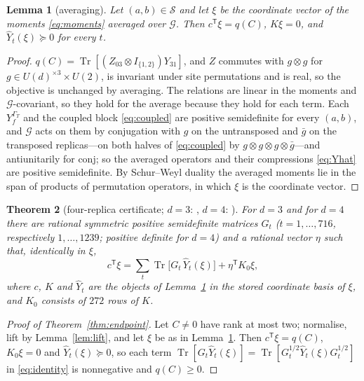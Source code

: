 \documentclass[aps,pra,twocolumn,superscriptaddress,nofootinbib,longbibliography]{revtex4-2}
\DeclareMathOperator{\Tr}{Tr}
\newcommand{\T}{\mathsf T}
\newcommand{\Yh}{\widehat Y}
\theoremstyle{plain}
\newtheorem{theorem}{Theorem}[section]
\newtheorem{lemma}[theorem]{Lemma}
\theoremstyle{definition}
\theoremstyle{remark}
\begin{document}
\begin{lemma}[averaging]\label{lem:averaging}
Let $(a,b)\in\mathcal S$ and let $\xi$ be the coordinate vector of the moments \eqref{eq:moments} averaged over $\mathcal G$. Then $c^{\T}\xi=q(C)$, $K\xi=0$, and $\Yh_t(\xi)\succeq0$ for every $t$.
\end{lemma}
\begin{proof}
$q(C)=\Tr[(Z_{03}\otimes I_{\{1,2\}})Y_{31}]$, and $Z$ commutes with $g\otimes g$ for $g\in U(d)^{\times3}\times U(2)$, is invariant under site permutations and is real, so the objective is unchanged by averaging. The relations are linear in the moments and $\mathcal G$\nobreakdash-covariant, so they hold for the average because they hold for each term. Each $Y_f^{\Gamma_T}$ and the coupled block \eqref{eq:coupled} are positive semidefinite for every $(a,b)$, and $\mathcal G$ acts on them by conjugation with $g$ on the untransposed and $\bar g$ on the transposed replicas---on both halves of \eqref{eq:coupled} by $g\otimes g\otimes g\otimes\bar g$---and antiunitarily for conj; so the averaged operators and their compressions \eqref{eq:Yhat} are positive semidefinite. By Schur--Weyl duality the averaged moments lie in the span of products of permutation operators, in which $\xi$ is the coordinate vector.
\end{proof}

\begin{theorem}[four-replica certificate; $d=3$: \cite{Zenodo}, $d=4$: \cite{Liu}]\label{thm:cert}
For $d=3$ and for $d=4$ there are rational symmetric positive semidefinite matrices $G_t$ ($t=1,\dots,716$, respectively $1,\dots,1239$; positive definite for $d=4$) and a rational vector $\eta$ such that, identically in $\xi$,
\begin{equation}\label{eq:identity}
c^{\T}\xi=\sum_t\Tr\bigl[G_t\,\Yh_t(\xi)\bigr]+\eta^{\T}K_0\xi ,
\end{equation}
where $c$, $K$ and $\Yh_t$ are the objects of Lemma~\ref{lem:averaging} in the stored coordinate basis of $\xi$, and $K_0$ consists of $272$ rows of $K$.
\end{theorem}

\begin{proof}[Proof of Theorem~\ref{thm:endpoint}]
Let $C\ne0$ have rank at most two; normalise, lift by Lemma~\ref{lem:lift}, and let $\xi$ be as in Lemma~\ref{lem:averaging}. Then $c^{\T}\xi=q(C)$, $K_0\xi=0$ and $\Yh_t(\xi)\succeq0$, so each term $\Tr[G_t\Yh_t(\xi)]=\Tr[G_t^{1/2}\Yh_t(\xi)G_t^{1/2}]$ in \eqref{eq:identity} is nonnegative and $q(C)\ge0$.
\end{proof}
\end{document}
